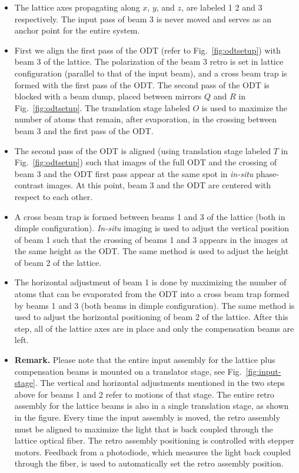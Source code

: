 \begin{itemize} 

\item The lattice axes propagating along $x$, $y$, and $z$, are labeled 1 2 and
3 respectively.   The input pass of beam 3 is never moved and serves as an
anchor point for the entire system.  

\item First we align the first pass of the ODT (refer to
Fig.~\ref{fig:odtsetup}) with beam 3 of the lattice.   The polarization of the
beam 3 retro is set in lattice configuration (parallel to that of the input
beam), and a cross beam trap is formed with the first pass of the ODT.  The
second pass of the ODT is blocked with a beam dump, placed between mirrors $Q$
and $R$ in Fig.~\ref{fig:odtsetup}.  The translation stage labeled $O$ is used
to maximize the number of atoms that remain, after evaporation, in  the
crossing between beam 3 and the first pass of the ODT. 

\item The second pass of the ODT is aligned (using translation stage labeled
$T$ in Fig.~\ref{fig:odtsetup}) such that images of the full ODT and the
crossing of beam 3 and the ODT first pass appear at the same spot in
\textit{in-situ} phase-contrast images.   At this point, beam 3 and the ODT are
centered with respect to each other. 

\item A cross beam trap is formed between beams 1 and 3 of the lattice (both in
dimple configuration).  \textit{In-situ} imaging is used to adjust the vertical
position of beam 1 such that the crossing of beams 1 and 3 appears in the
images at the same height as the ODT.   The same method is used to adjust the
height of beam 2 of the lattice. 

\item The horizontal adjustment of beam 1 is done by maximizing the number of
atoms that can be evaporated from the ODT into a cross beam trap formed by
beams 1 and 3 (both beams in dimple configuration).  The same method is used to
adjust the horizontal positioning of beam 2 of the lattice.  After this step,
all of the lattice axes are in place and only the compensation beams are left.

\item  \textbf{Remark.} Please note that the entire input assembly for the
lattice plus compensation beams is mounted on a translator stage, see
Fig.~\ref{fig:input-stage}.  The vertical and horizontal adjustments mentioned
in the two steps above for beams 1 and 2 refer to motions of that stage.  The
entire retro assembly for the lattice beams is also in a single translation
stage, as shown in the figure.  Every time the input assembly is moved, the
retro assembly must be aligned to maximize the light that is back coupled
through the lattice optical fiber.   The retro assembly positioning is
controlled with stepper motors.  Feedback from a photodiode, which measures the
light back coupled through the fiber, is used to automatically set the retro
assembly position.  


\end{itemize}
